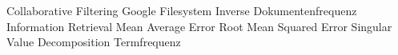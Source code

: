 \begin{acronym}[XXXXXXX]
	\setlength{\itemsep --- }{-\parsep}
  \setlength{\itemsep}{1pt}
  \setlength{\parskip}{0pt}
  \setlength{\parsep}{0pt}
         {Collaborative Filtering}
         {Google Filesystem}
         {Inverse Dokumentenfrequenz}
         {Information Retrieval}
         {Mean Average Error}
         {Root Mean Squared Error}
         {Singular Value Decomposition}
         {Termfrequenz}
\end{acronym}